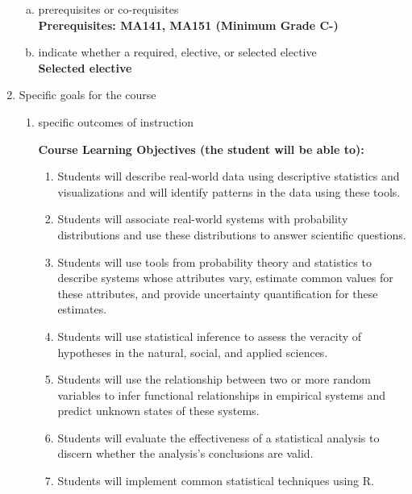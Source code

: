 \begin{enumerate}[1.]
\begin{enumerate}[a.]
\item prerequisites or co-requisites\\
  {\bfseries
    Prerequisites: MA141, MA151 (Minimum Grade C-) \\  %
  }

\item indicate whether a required, elective, or selected elective\\ %
  {\bfseries
    Selected elective
  }

\end{enumerate}

\item Specific goals for the course
\begin{enumerate}
\item specific outcomes of instruction\\ %
  {\bfseries
    Course Learning Objectives (the student will be able to):
    \begin{enumerate}[1.]
\item Students will describe real-world data using descriptive statistics and
visualizations and will identify patterns in the data using these tools.
\item Students will associate real-world systems with probability distributions
and use these distributions to answer scientific questions.
\item Students will use tools from probability theory and statistics to describe
systems whose attributes vary, estimate common values for these
attributes, and provide uncertainty quantification for these estimates.
\item Students will use statistical inference to assess the veracity of hypotheses
in the natural, social, and applied sciences.
\item Students will use the relationship between two or more random variables
to infer functional relationships in empirical systems and predict unknown
states of these systems.
\item Students will evaluate the effectiveness of a statistical analysis to discern
whether the analysis’s conclusions are valid.
\item Students will implement common statistical techniques using R.
    \end{enumerate}
  }


\end{enumerate}
\end{enumerate}
